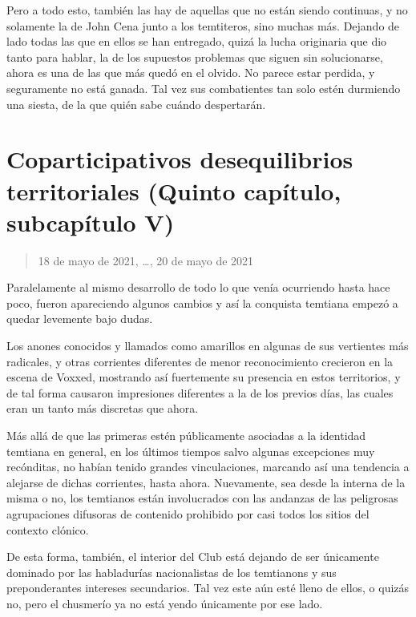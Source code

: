 \documentclass[
  spanish,
]{book}
\begin{document}
Pero a todo esto, también las hay de aquellas que no están siendo continuas, y no solamente la de John Cena junto a los temtiteros, sino muchas más. Dejando de lado todas las que en ellos se han entregado, quizá la lucha originaria que dio tanto para hablar, la de los supuestos problemas que siguen sin solucionarse, ahora es una de las que más quedó en el olvido. No parece estar perdida, y seguramente no está ganada. Tal vez sus combatientes tan solo estén durmiendo una siesta, de la que quién sabe cuándo despertarán.

\hypertarget{coparticipativos-desequilibrios-territoriales-quinto-capuxedtulo-subcapuxedtulo-v}{%
\section{Coparticipativos desequilibrios territoriales (Quinto capítulo, subcapítulo V)}\label{coparticipativos-desequilibrios-territoriales-quinto-capuxedtulo-subcapuxedtulo-v}}

\begin{quote}
18 de mayo de 2021, \ldots, 20 de mayo de 2021
\end{quote}

Paralelamente al mismo desarrollo de todo lo que venía ocurriendo hasta hace poco, fueron apareciendo algunos cambios y así la conquista temtiana empezó a quedar levemente bajo dudas.

Los anones conocidos y llamados como amarillos en algunas de sus vertientes más radicales, y otras corrientes diferentes de menor reconocimiento crecieron en la escena de Voxxed, mostrando así fuertemente su presencia en estos territorios, y de tal forma causaron impresiones diferentes a la de los previos días, las cuales eran un tanto más discretas que ahora.

Más allá de que las primeras estén públicamente asociadas a la identidad temtiana en general, en los últimos tiempos salvo algunas excepciones muy recónditas, no habían tenido grandes vinculaciones, marcando así una tendencia a alejarse de dichas corrientes, hasta ahora. Nuevamente, sea desde la interna de la misma o no, los temtianos están involucrados con las andanzas de las peligrosas agrupaciones difusoras de contenido prohibido por casi todos los sitios del contexto clónico.

De esta forma, también, el interior del Club está dejando de ser únicamente dominado por las habladurías nacionalistas de los temtianons y sus preponderantes intereses secundarios. Tal vez este aún esté lleno de ellos, o quizás no, pero el chusmerío ya no está yendo únicamente por ese lado.
\end{document}
